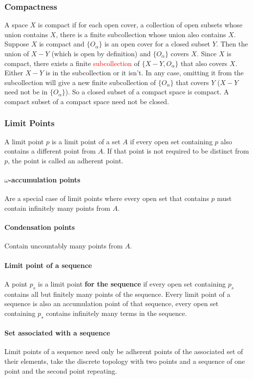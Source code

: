 \documentclass{article}
\begin{document}
\subsubsection{Compactness}
A space $X$ is compact if for each open cover, a collection of open subsets whose union contains $X$, there
is a finite subcollection whose union also contains $X$. Suppose $X$ is compact and $\{O_\alpha\}$ is an open cover for a closed subset $Y$.
Then the union of $X-Y$ (which is open by definition) and $\{O_\alpha\}$ covers $X$. Since $X$ is compact, there exists a finite \textcolor{red}{subcollection} of $\{X-Y, O_\alpha\}$ that also covers $X$.
Either $X-Y$ is in the subcollection or it isn't.
In any case, omitting it from the subcollection will give a new
finite subcollection of $\{O_\alpha\}$ that covers $Y$ ($X-Y$ need not be in $\{O_\alpha\}$).
So a closed subset of  a compact space is compact.
A compact subset of a compact space need not be closed.

\subsubsection{Limit Points}
A limit point $p$ is a limit point of a set $A$
if every open set containing $p$ also contains
a different point from $A$. If that point is not required to be distinct from $p$,
the point is called an adherent point.
\paragraph{$\omega$-accumulation points}
Are a special case of limit points where
 every open set that contains $p$ must contain infinitely many points from $A$.
\paragraph{Condensation points}
Contain uncountably many points from $A$.
\paragraph{Limit point of a sequence}
A point $p_s$ is a limit point \textbf{for the sequence}
 if every open set containing $p_s$ contains all but finitely many points of the sequence. Every limit
 point of a sequence is also an accumulation point of that sequence, every open set containing $p_s$ contains infinitely many terms in the sequence.
\paragraph{Set associated with a sequence}
Limit points of a sequence need only be adherent points of the associated set of their elements, take the discrete topology
with two points and a sequence of one point and the second point repeating.
\end{document}
